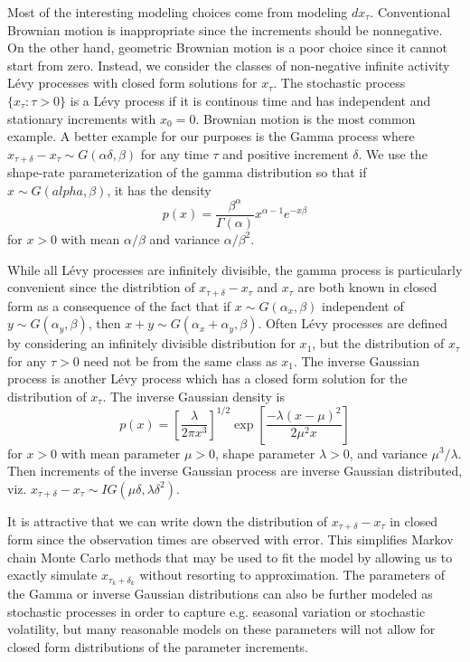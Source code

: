 \documentclass{article}
\begin{document}
Most of the interesting modeling choices come from modeling $dx_\tau$. Conventional Brownian motion is inappropriate since the increments should be nonnegative. On the other hand, geometric Brownian motion is a poor choice since it cannot start from zero. Instead, we consider the classes of non-negative infinite activity L\'{e}vy processes with closed form solutions for $x_{\tau}$. The stochastic process $\{x_{\tau}:\tau>0\}$ is a L\'{e}vy process if it is continous time and has independent and stationary increments with $x_0=0$. Brownian motion is the most common example. A better example for our purposes is the Gamma process where $x_{\tau + \delta} - x_{\tau} \sim G(\alpha \delta, \beta)$ for any time $\tau$ and positive increment $\delta$. We use the shape-rate parameterization of the gamma distribution so that if $x\sim G(alpha,\beta)$, it has the density
\[
p(x) = \frac{\beta^\alpha}{\Gamma(\alpha)}x^{\alpha-1}e^{-x\beta}
\]
for $x>0$ with mean $\alpha/\beta$ and variance $\alpha/\beta^2$. 

While all L\'{e}vy processes are infinitely divisible, the gamma process is particularly convenient since the distribtion of $x_{\tau+\delta} - x_\tau$ and $x_\tau$ are both known in closed form as a consequence of the fact that if $x\sim G(\alpha_x,\beta)$ independent of $y\sim G(\alpha_y,\beta)$, then $x+y \sim G(\alpha_x + \alpha_y, \beta)$. Often L\'{e}vy processes are defined by considering an infinitely divisible distribution for $x_1$, but the distribution of $x_{\tau}$ for any $\tau>0$ need not be from the same class as $x_1$. The inverse Gaussian process is another L\'{e}vy process which has a closed form solution for the distribution of $x_\tau$. The inverse Gaussian density is
\[
p(x) = \left[\frac{\lambda}{2\pi x^3}\right]^{1/2}\exp\left[\frac{-\lambda(x - \mu)^2}{2\mu^2x}\right]
\]
for $x>0$ with mean parameter $\mu>0$, shape parameter $\lambda>0$, and variance $\mu^3/\lambda$. Then increments of the inverse Gaussian process are inverse Gaussian distributed, viz. $x_{\tau + \delta} - x_\tau \sim IG(\mu\delta,\lambda\delta^2)$. 

It is attractive that we can write down the distribution of $x_{\tau + \delta} - x_\tau$ in closed form since the observation times are observed with error. This simplifies Markov chain Monte Carlo methods that may be used to fit the model by allowing us to exactly simulate $x_{\tau_k + \delta_k}$ without resorting to approximation. The parameters of the Gamma or inverse Gaussian distributions can also be further modeled as stochastic processes in order to capture e.g. seasonal variation or stochastic volatility, but many reasonable models on these parameters will not allow for closed form distributions of the parameter increments. 
\end{document}
